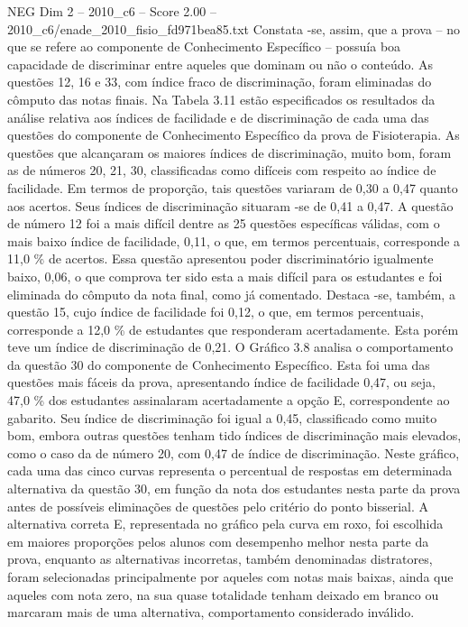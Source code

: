 \begin{textsample}{NEG Dim 2 – 2010\_c6 – Score 2.00 – 2010\_c6/enade\_2010\_fisio\_fd971bea85.txt}
Constata -se, assim, que a prova – no que se refere ao componente de Conhecimento Específico – possuía boa capacidade de discriminar entre aqueles que dominam ou não o conteúdo.
As questões 12, 16 e 33, com índice fraco de discriminação, foram eliminadas do cômputo das notas finais.
Na Tabela 3.11 estão especificados os resultados da análise relativa aos índices de facilidade e de discriminação de cada uma das questões do componente de Conhecimento Específico da prova de Fisioterapia.
As questões que alcançaram os maiores índices de discriminação, muito bom, foram as de números 20, 21, 30, classificadas como difíceis com respeito ao índice de facilidade.
Em termos de proporção, tais questões variaram de 0,30 a 0,47 quanto aos acertos.
Seus índices de discriminação situaram -se de 0,41 a 0,47.
A questão de número 12 foi a mais difícil dentre as 25 questões específicas válidas, com o mais baixo índice de facilidade, 0,11, o que, em termos percentuais, corresponde a 11,0 \% de acertos.
Essa questão apresentou poder discriminatório igualmente baixo, 0,06, o que comprova ter sido esta a mais difícil para os estudantes e foi eliminada do cômputo da nota final, como já comentado.
Destaca -se, também, a questão 15, cujo índice de facilidade foi 0,12, o que, em termos percentuais, corresponde a 12,0 \% de estudantes que responderam acertadamente.
Esta porém teve um índice de discriminação de 0,21.
O Gráfico 3.8 analisa o comportamento da questão 30 do componente de Conhecimento Específico.
Esta foi uma das questões mais fáceis da prova, apresentando índice de facilidade 0,47, ou seja, 47,0 \% dos estudantes assinalaram acertadamente a opção E, correspondente ao gabarito.
Seu índice de discriminação foi igual a 0,45, classificado como muito bom, embora outras questões tenham tido índices de discriminação mais elevados, como o caso da de número 20, com 0,47 de índice de discriminação.
Neste gráfico, cada uma das cinco curvas representa o percentual de respostas em determinada alternativa da questão 30, em função da nota dos estudantes nesta parte da prova antes de possíveis eliminações de questões pelo critério do ponto bisserial.
A alternativa correta E, representada no gráfico pela curva em roxo, foi escolhida em maiores proporções pelos alunos com desempenho melhor nesta parte da prova, enquanto as alternativas incorretas, também denominadas distratores, foram selecionadas principalmente por aqueles com notas mais baixas, ainda que aqueles com nota zero, na sua quase totalidade tenham deixado em branco ou marcaram mais de uma alternativa, comportamento considerado inválido.

\end{textsample}
